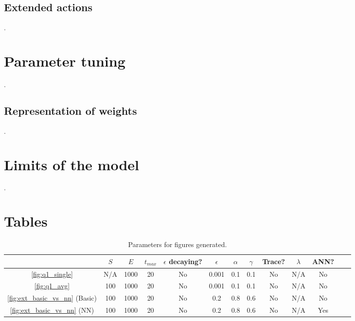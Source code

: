 \documentclass[a4paper, 11pt, twocolumn, final]{article} %
\begin{document}
\subsection{Extended actions} .

\section{Parameter tuning} .

\subsection{Representation of weights} .

\section{Limits of the model} .




\onecolumn \appendix

\section{Tables}
\begin{table}[H]
  \centering
  \begin{tabular}{c | c c c c c c c c c c c c}
    \hline
    & $S$ & $E$ & $t_{max}$ & $\epsilon$ decaying? & $\epsilon$ & $\alpha$ &
      $\gamma$ & Trace? & $\lambda$ & ANN? \\
    \hline
    \autoref{fig:q1_single} & N/A & 1000 & 20 & No & 0.001 & 0.1 & 0.1 & No &
      N/A & No \\
    \autoref{fig:q1_avg} & 100 & 1000 & 20 & No & 0.001 & 0.1 & 0.1 & No &
      N/A & No \\
    \autoref{fig:ext_basic_vs_nn} (Basic) & 100 & 1000 & 20 & No & 0.2 & 0.8 &
      0.6 & No & N/A & No \\
    \autoref{fig:ext_basic_vs_nn} (NN) & 100 & 1000 & 20 & No & 0.2 & 0.8 &
      0.6 & No & N/A & Yes \\
    \hline
  \end{tabular}
  \caption{Parameters for figures generated.}
  \label{tab:parameters}
\end{table}
\end{document}
